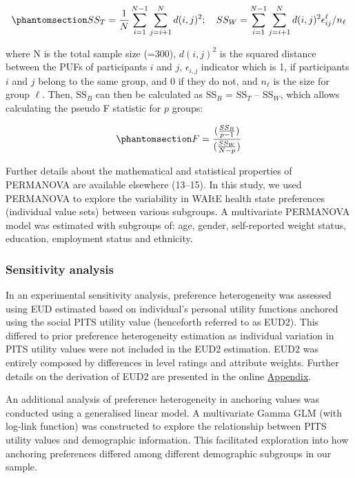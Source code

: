 \documentclass[
  letterpaper,
  DIV=11,
  numbers=noendperiod]{scrartcl}
\begin{document}
\begin{equation}\phantomsection\label{eq-sumsquares}{ 
    SS_{T} = \frac{1}{N}\sum_{i=1}^{N-1}\sum_{j=i+1}^{N}d(i,j)^{2}; \quad SS_{W} = \sum_{i=1}^{N-1}\sum_{j=i+1}^{N}d(i,j)^{2}\epsilon_{ij}^{\ell}/n_{\ell}
}\end{equation}

where N is the total sample size (=300), \(d(i,j)^2\) is the squared
distance between the PUFs of participants \(i\) and \(j\),
\(\epsilon_{i,j}\) indicator which is 1, if participants \(i\) and \(j\)
belong to the same group, and 0 if they do not, and \(n_{\ell}\) is the
size for group \(\ell\). Then, SS\(_B\) can then be calculated as
SS\(_B\) = SS\(_T\) -- SS\(_W\), which allows calculating the pseudo F
statistic for \(p\) groups:

\begin{equation}\phantomsection\label{eq-ssb}{
F= \frac{(\frac{SS_B}{p-1})}{(\frac{SS_W}{N-p})}
}\end{equation}

Further details about the mathematical and statistical properties of
PERMANOVA are available elsewhere (13--15). In this study, we used
PERMANOVA to explore the variability in WAItE health state preferences
(individual value sets) between various subgroups. A multivariate
PERMANOVA model was estimated with subgroups of: age, gender,
self-reported weight status, education, employment status and ethnicity.

\subsubsection{Sensitivity analysis}\label{sec-opuf-eud2}

In an experimental sensitivity analysis, preference heterogeneity was
assessed using EUD estimated based on individual's personal utility
functions anchored using the social PITS utility value (henceforth
referred to as EUD2). This differed to prior preference heterogeneity
estimation as individual variation in PITS utility values were not
included in the EUD2 estimation. EUD2 was entirely composed by
differences in level ratings and attribute weights. Further details on
the derivation of EUD2 are presented in the online
\href{https://willking98.github.io/opuf-adult/}{Appendix}.

An additional analysis of preference heterogeneity in anchoring values
was conducted using a generalised linear model. A multivariate Gamma GLM
(with log-link function) was constructed to explore the relationship
between PITS utility values and demographic information. This
facilitated exploration into how anchoring preferences differed among
different demographic subgroups in our sample.
\end{document}
